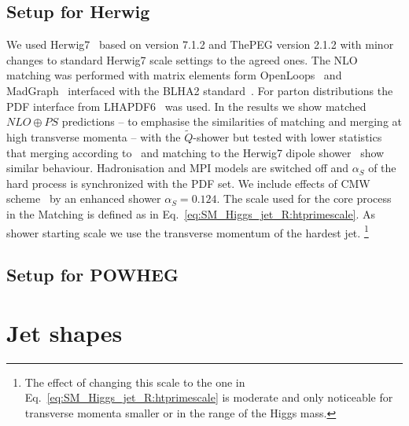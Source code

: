 \documentclass[aps,prd,onecolumn,fleqn,superscriptaddress,groupedaddress,nofootinbib,preprintnumbers,nobalancelastpage]{revtex4}
\begin{document}
\subsection{Setup for Herwig}
We used 
Herwig7~\cite{Bahr:2008pv,Bellm:2015jjp,Platzer:2011bc} based on
version 7.1.2  and ThePEG version 2.1.2 with minor changes to standard 
Herwig7
scale settings to the agreed ones. The NLO matching was performed with matrix
elements form OpenLoops~\cite{Cascioli:2011va} and MadGraph~\cite{Alwall:2011uj}
interfaced with the BLHA2 standard~\cite{Alioli:2013nda}.  For parton
distributions the PDF interface from LHAPDF6~\cite{Buckley:2014ana} was used. In
the results we show matched $NLO \oplus PS$ predictions -- to emphasise the
similarities of matching and merging at high transverse momenta -- with the
$\tilde{Q}$-shower but tested with lower statistics that merging according 
to~\cite{Bellm:2017ktr} and matching to the 
Herwig7 dipole
shower~\cite{Platzer:2009jq} show similar behaviour. Hadronisation and MPI models
are switched off and $\alpha_S$ of the hard process is synchronized with the PDF
set. We include effects of CMW scheme~\cite{Catani:1990rr} by an enhanced
shower $\alpha_S=0.124$.  The scale used for the core process in the Matching is
defined as in Eq.~\eqref{eq:SM_Higgs_jet_R:htprimescale}. As shower starting scale we use the
transverse momentum of the hardest jet.%
\footnote{The effect of changing this
scale to the one in Eq.~\eqref{eq:SM_Higgs_jet_R:htprimescale} is moderate and only noticeable
for transverse momenta smaller or in the range of the Higgs mass.}

\subsection{Setup for POWHEG}

\section{Jet shapes}
\end{document}

